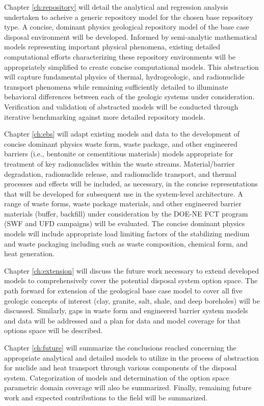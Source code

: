 Chapter \ref{ch:repository} will detail the analytical and regression 
analysis undertaken to acheive a generic repository model for the 
chosen base repository type. A concise, dominant physics geological 
repository model of the base case disposal environment will be 
developed. Informed by semi-analytic mathematical models representing 
important physical phenomena, existing detailed computational efforts 
characterizing these repository environments will be appropriately 
simplified to create concise computational models. This abstraction 
will capture fundamental physics of thermal, hydrogeologic, and 
radionuclide transport phenomena while remaining sufficiently detailed 
to illuminate behavioral differences between each of the geologic 
systems under consideration.  Verification and validation of 
abstracted models will be conducted through iterative benchmarking 
against more detailed repository models.


Chapter \ref{ch:ebs} will adapt existing models and data to the 
development of concise dominant physics waste form, waste package, and 
other engineered barriers (i.e., bentonite or cementitious materials) 
models appropriate for treatment of key radionuclides within the waste 
streams.  Material/barrier degradation, radionuclide release, and 
radionuclide transport, and thermal processes and effects will be 
included, as necessary, in the concise representations that will be 
developed for subsequent use in the system-level architecture. A range 
of waste forms, waste package materials, and other engineered barrier 
materials (buffer, backfill) under consideration by the DOE-NE FCT 
program (SWF and UFD campaigns) will be evaluated. The concise 
dominant physics models will include appropriate load limiting factors 
of the stabilizing medium and waste packaging including such as waste 
composition, chemical form, and heat generation.

Chapter \ref{ch:extension} will discuss the future work necessary to 
extend developed models to comprehensively cover the potential 
disposal system option space. The path forward for extension of the 
geological base case model to cover all five geologic concepts of 
interest (clay, granite, salt, shale, and deep boreholes) will be 
discussed. Similarly, gaps in waste form and engineered barrier system 
models and data will be addressed and a plan for data and model 
coverage for that options space will be described.

Chapter \ref{ch:future} will summarize the conclusions reached 
concerning the appropriate analytical and detailed models to utilize 
in the process of abstraction for nuclide and heat transport through 
various components of the disposal system. Categorization of models 
and determination of the option space parametric domain coverage will 
also be summarized. Finally, remaining future work and expected 
contributions to the field will be summarized. 
